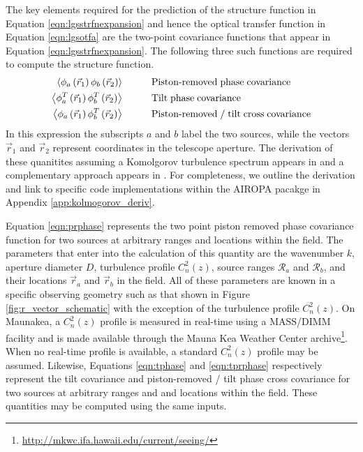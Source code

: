 The key elements required for the prediction of the structure function
in Equation \ref{eqn:lgsstrfnexpansion} and hence the optical transfer
function in Equation \ref{eqn:lgsotfa} are the two-point covariance
functions that appear in Equation \ref{eqn:lgsstrfnexpansion}.  The
following three such functions are required to compute the structure
function.
\begin{align}
\left\langle \phi_{a}\left(\vec{r}_{1}\right) \phi_{b}\left(\vec{r}_{2}\right) \right\rangle &\quad\quad\quad {\rm Piston\text{-}removed\;phase\;covariance} \label{eqn:prphase} \\
\left\langle \phi^{T}_{a}\left(\vec{r}_{1}\right) \phi^{T}_{b}\left(\vec{r}_{2}\right) \right\rangle &\quad\quad\quad {\rm Tilt\;phase\;covariance} \label{eqn:tphase} \\
\left\langle \phi_{a}\left(\vec{r}_{1}\right) \phi^{T}_{b}\left(\vec{r}_{2}\right) \right\rangle &\quad\quad\quad {\rm Piston\text{-}removed\;/\;tilt\;cross\;covariance} \label{eqn:tprphase} 
\end{align}
In this expression the subscripts $a$ and $b$ label the two sources,
while the vectors $\vec{r}_{1}$ and $\vec{r}_{2}$
represent coordinates in the telescope aperture.  
The derivation of these quanitites assuming a Komolgorov
turbulence spectrum appears in
\cite{Tyler:1994a} and a complementary approach appears in 
\cite{Sasiela:2012}.
For completeness, we outline the derivation and 
link to specific code implementations within the AIROPA
pacakge in Appendix \ref{app:kolmogorov_deriv}. 


Equation \ref{eqn:prphase} represents the two point piston removed
phase covariance function for two sources at arbitrary ranges and
locations within the field.  The parameters that enter into the
calculation of this quantity are the wavenumber $k$, aperture diameter
$D$, turbulence profile $C_{n}^{2}(z)$, source ranges
$\mathcal{R}_{a}$ and $\mathcal{R}_{b}$, and their locations
$\vec{r}_{a}$ and $\vec{r}_{b}$ in the field.  All of
these parameters are known in a specific observing geometry such as
that shown in Figure \ref{fig:r_vector_schematic} with the exception of the turbulence
profile $C_{n}^{2}(z)$.  
On Maunakea, a $C_{n}^{2}(z)$ profile is measured in real-time
using a MASS/DIMM facility and is made available through the Mauna Kea Weather
Center archive\footnote{\url{http://mkwc.ifa.hawaii.edu/current/seeing/}}. 
When no real-time profile is available, 
a standard $C_{n}^{2}(z)$ profile may be assumed.  Likewise,
Equations \ref{eqn:tphase} and \ref{eqn:tprphase} respectively represent
the tilt covariance and piston-removed / tilt phase cross covariance
for two sources at arbitrary ranges and and locations within the
field.  These quantities may be computed using the same inputs.

